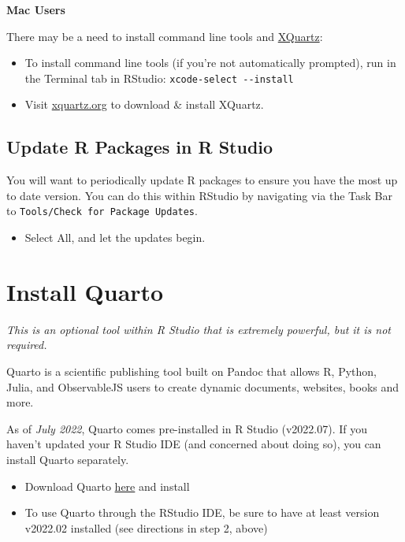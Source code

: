 \documentclass[
]{book}
\providecommand{\tightlist}{%
  \setlength{\itemsep}{0pt}\setlength{\parskip}{0pt}}
\begin{document}
\textbf{Mac Users}

There may be a need to install command line tools and \href{https://www.xquartz.org/}{XQuartz}:

\begin{itemize}
\item
  To install command line tools (if you're not automatically prompted), run in the Terminal tab in RStudio: \texttt{xcode-select\ -\/-install}
\item
  Visit \href{https://www.xquartz.org/}{xquartz.org} to download \& install XQuartz.
\end{itemize}

\hypertarget{update-r-packages-in-r-studio}{%
\subsection{Update R Packages in R Studio}\label{update-r-packages-in-r-studio}}

You will want to periodically update R packages to ensure you have the most up to date version. You can do this within RStudio by navigating via the Task Bar to \texttt{Tools/Check\ for\ Package\ Updates}.

\begin{itemize}
\tightlist
\item
  Select All, and let the updates begin.
\end{itemize}

\hypertarget{install-quarto}{%
\section{Install Quarto}\label{install-quarto}}

\emph{This is an optional tool within R Studio that is extremely powerful, but it is not required.}

Quarto is a scientific publishing tool built on Pandoc that allows R, Python, Julia, and ObservableJS users to create dynamic documents, websites, books and more.

As of \emph{July 2022}, Quarto comes pre-installed in R Studio (v2022.07). If you haven't updated your R Studio IDE (and concerned about doing so), you can install Quarto separately.

\begin{itemize}
\item
  Download Quarto \href{https://quarto.org/docs/get-started/}{here} and install
\item
  To use Quarto through the RStudio IDE, be sure to have at least version v2022.02 installed (see directions in step 2, above)
\end{itemize}
\end{document}
